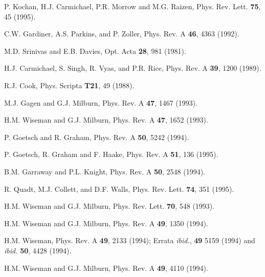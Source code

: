 \documentclass[12pt]{article}
\begin{document}
\begin{thebibliography}{99}
P. Kochan, H.J. Carmichael, P.R. Morrow and M.G. Raizen,
Phys. Rev. Lett. {\bf 75}, 45 (1995).

C.W. Gardiner, A.S. Parkins, and P. Zoller,
Phys. Rev. A {\bf 46}, 4363 (1992).

M.D. Srinivas and E.B. Davies,
Opt. Acta {\bf 28}, 981 (1981).

H.J. Carmichael, S. Singh, R. Vyas, and P.R. Rice,
Phys. Rev. A {\bf 39}, 1200 (1989).

R.J. Cook, %
Phys. Scripta {\bf T21}, 49 (1988).

M.J. Gagen and G.J. Milburn,
Phys. Rev. A {\bf 47}, 1467 (1993).

H.M. Wiseman and G.J. Milburn,
Phys. Rev. A {\bf 47}, 1652  (1993).

P. Goetsch and R. Graham,
Phys. Rev. A {\bf 50}, 5242 (1994).

P. Goetsch, R. Graham and F. Haake,
Phys. Rev. A {\bf 51}, 136 (1995).

B.M. Garraway and P.L. Knight,
Phys. Rev. A {\bf 50}, 2548 (1994).

R. Quadt, M.J. Collett, and D.F. Walls,
Phys. Rev. Lett. {\bf 74}, 351 (1995).

H.M. Wiseman and G.J. Milburn,
Phys. Rev. Lett. {\bf 70}, 548 (1993).

H.M. Wiseman and G.J. Milburn,
Phys. Rev. A {\bf 49}, 1350 (1994).

H.M. Wiseman,
Phys. Rev. A {\bf 49}, 2133 (1994);
Errata {\em ibid.}, {\bf 49} 5159 (1994) and {\em ibid.} {\bf 50}, 4428 (1994).

H.M. Wiseman and G.J. Milburn,
Phys. Rev. A {\bf 49}, 4110 (1994).


\end{thebibliography}
\end{document}

